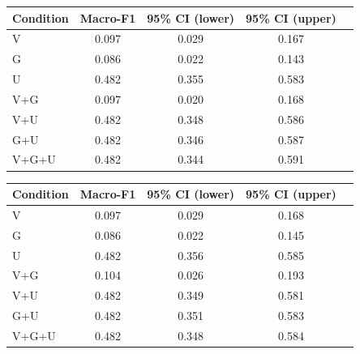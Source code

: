 \begin{tabular}{lcccc}
\toprule
Condition & Macro-F1 & 95\% CI (lower) & 95\% CI (upper) \\
\midrule
V & 0.097 & 0.029 & 0.167 \\
G & 0.086 & 0.022 & 0.143 \\
U & 0.482 & 0.355 & 0.583 \\
V+G & 0.097 & 0.020 & 0.168 \\
V+U & 0.482 & 0.348 & 0.586 \\
G+U & 0.482 & 0.346 & 0.587 \\
V+G+U & 0.482 & 0.344 & 0.591 \\
\bottomrule
\end{tabular}

\begin{tabular}{lcccc}
\toprule
Condition & Macro-F1 & 95\% CI (lower) & 95\% CI (upper) \\
\midrule
V & 0.097 & 0.029 & 0.168 \\
G & 0.086 & 0.022 & 0.145 \\
U & 0.482 & 0.356 & 0.585 \\
V+G & 0.104 & 0.026 & 0.193 \\
V+U & 0.482 & 0.349 & 0.581 \\
G+U & 0.482 & 0.351 & 0.583 \\
V+G+U & 0.482 & 0.348 & 0.584 \\
\bottomrule
\end{tabular}
